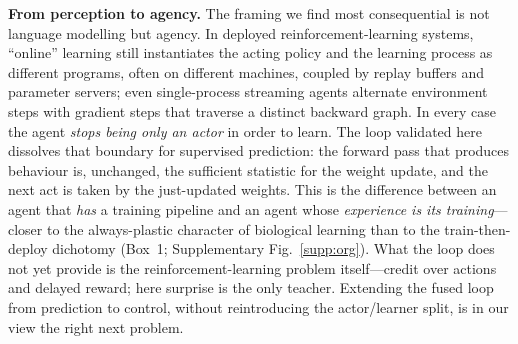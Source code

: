 \documentclass[11pt]{article}
\newcommand{\heading}[1]{\vspace{4pt}\noindent\textbf{#1}\hspace{0.6em}}
\begin{document}
\heading{From perception to agency.}
The framing we find most consequential is not language modelling but agency. In
deployed reinforcement-learning systems, ``online'' learning still instantiates
the acting policy and the learning process as different programs, often on
different machines, coupled by replay buffers and parameter
servers\cite{espeholt2018impala,horgan2018distributed,sutton1991dyna}; even
single-process streaming agents alternate environment steps with gradient steps
that traverse a distinct backward graph\cite{elsayed2024streaming}. In every
case the agent \emph{stops being only an actor} in order to learn. The loop
validated here dissolves that boundary for supervised prediction: the forward
pass that produces behaviour is, unchanged, the sufficient statistic for the
weight update, and the next act is taken by the just-updated weights. This is the
difference between an agent that \emph{has} a training pipeline and an agent
whose \emph{experience is its training}---closer to the always-plastic character
of biological learning than to the train-then-deploy dichotomy (Box~1;
Supplementary Fig.~\ref{supp:org}). What the
loop does not yet provide is the reinforcement-learning problem itself---credit
over actions and delayed reward; here surprise is the only teacher. Extending the
fused loop from prediction to control, without reintroducing the actor/learner
split, is in our view the right next problem.
\end{document}
